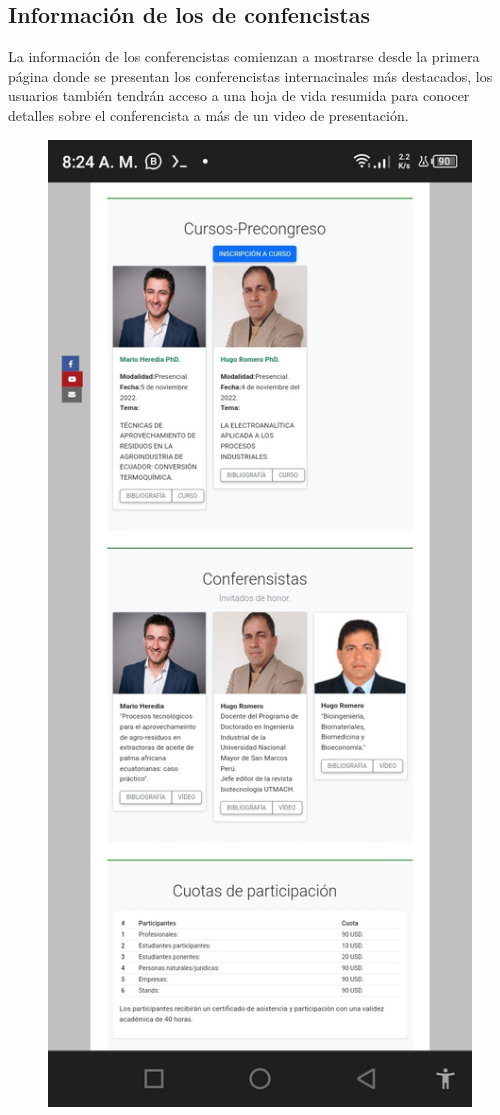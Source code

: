 \documentclass[a4paper,14px]{article}
\begin{document}
\newpage
\subsection{Información de los  de confencistas }
\label{sec:pagina-principal}

La información de los conferencistas comienzan a mostrarse desde la primera página donde se presentan los conferencistas internacinales más destacados, los usuarios también tendrán acceso a una hoja de vida resumida para conocer detalles sobre el conferencista a más de un video de presentación.

  

\begin{minipage}[H]{0.5\linewidth}
  \begin{figure}[H]
    \centering
    \includegraphics[scale=0.3]{conferencistas.jpg}

\end{figure}
\end{minipage}
\end{document}
